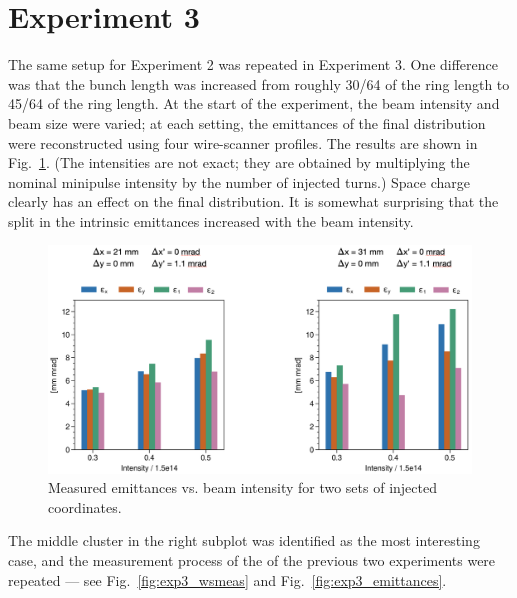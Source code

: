 \section{Experiment 3}

The same setup for Experiment 2 was repeated in Experiment 3. One difference was that the bunch length was increased from roughly 30/64 of the ring length to 45/64 of the ring length. At the start of the experiment, the beam intensity and beam size were varied; at each setting, the emittances of the final distribution were reconstructed using four wire-scanner profiles. The results are shown in Fig.~\ref{fig:exp3_search}. (The intensities are not exact; they are obtained by multiplying the nominal minipulse intensity by the number of injected turns.) Space charge clearly has an effect on the final distribution. It is somewhat surprising that the split in the intrinsic emittances increased with the beam intensity. 
%
\begin{figure}[!p]
    \centering
    \vspace*{1.0cm}
    \includegraphics[width=\textwidth]{Images/chapter5/exp3/search.png}
    \caption{Measured emittances vs. beam intensity for two sets of injected coordinates.}
    \label{fig:exp3_search}
    \vspace*{1.0cm}
\end{figure}
%
The middle cluster in the right subplot was identified as the most interesting case, and the measurement process of the  of the previous two experiments were repeated — see Fig.~\ref{fig:exp3_wsmeas} and Fig.~\ref{fig:exp3_emittances}.
%

